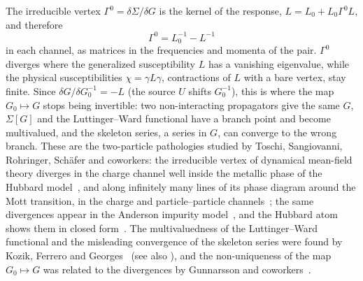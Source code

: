\documentclass[11pt,a4paper]{article}
\begin{document}
The irreducible vertex $\Gamma^0=\delta\Sigma/\delta G$ is the kernel of the response, $L=L_0+L_0\Gamma^0L$, and therefore
\[
\Gamma^0=L_0^{-1}-L^{-1}
\]
in each channel, as matrices in the frequencies and momenta of the pair. $\Gamma^0$ diverges where the generalized
susceptibility $L$ has a vanishing eigenvalue, while the physical susceptibilities $\chi=\gamma L\gamma$, contractions of $L$
with a bare vertex, stay finite. Since $\delta G/\delta G_0^{-1}=-L$ (the source $U$ shifts $G_0^{-1}$), this is where the map
$G_0\mapsto G$ stops being invertible: two non-interacting propagators give the same $G$, $\Sigma[G]$ and the Luttinger--Ward
functional have a branch point and become multivalued, and the skeleton series, a series in $G$, can converge to the wrong
branch. These are the two-particle pathologies studied by Toschi, Sangiovanni, Rohringer, Sch\"afer and coworkers: the
irreducible vertex of dynamical mean-field theory diverges in the charge channel well inside the metallic phase of the
Hubbard model~\cite{Schaefer2013}, and along infinitely many lines of its phase diagram around the Mott transition, in the
charge and particle--particle channels~\cite{Schaefer2016}; the same
divergences appear in the Anderson impurity model~\cite{Chalupa2018}, and the Hubbard atom shows them in closed
form~\cite{Thunstroem2018}. The multivaluedness of the Luttinger--Ward functional and the misleading convergence of the
skeleton series were found by Kozik, Ferrero and Georges~\cite{KozikFerreroGeorges2015} (see also
\cite{StanRomaniello2015,RossiWerner2015}), and the non-uniqueness of the map $G_0\mapsto G$ was related to the divergences
by Gunnarsson and coworkers~\cite{Gunnarsson2017}.
\end{document}
